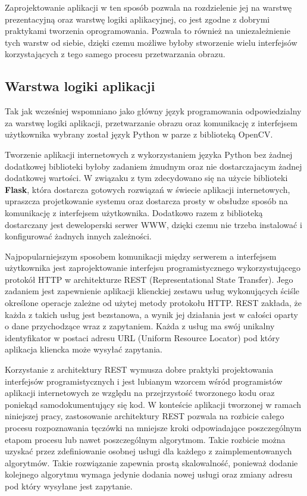 Zaprojektowanie aplikacji w ten sposób pozwala na rozdzielenie jej na warstwę prezentacyjną
oraz warstwę logiki aplikacyjnej, co jest zgodne z dobrymi praktykami tworzenia oprogramowania.
Pozwala to również na uniezależnienie tych warstw od siebie, dzięki czemu możliwe
byłoby stworzenie wielu interfejsów korzystających z tego samego procesu przetwarzania obrazu.

\subsection{Warstwa logiki aplikacji}

Tak jak wcześniej wspomniano jako główny język programowania odpowiedzialny za warstwę logiki
aplikacji, przetwarzanie obrazu oraz komunikację z interfejsem użytkownika wybrany został język
Python w parze z biblioteką OpenCV.

Tworzenie aplikacji internetowych z wykorzystaniem języka Python bez żadnej dodatkowej
biblioteki byłoby zadaniem żmudnym oraz nie dostarczajacym żadnej dodatkowej wartości. W związaku
z tym zdecydowano się na użycie biblioteki \textbf{Flask}, która dostarcza gotowych rozwiązań
w świecie aplikacji internetowych, upraszcza projetkowanie systemu oraz dostarcza prosty w obsłudze
sposób na komunikację z interfejsem użytkownika. Dodatkowo razem z biblioteką dostarczany jest
deweloperski serwer WWW, dzięki czemu nie trzeba instalowa\'c i konfigurowa\'c żadnych innych zależności.
\newline

Najpopularniejszym sposobem komunikacji między serwerem a interfejsem użytkownika jest zaprojektowanie
interfejsu programistycznego wykorzystującego protokół HTTP w architekturze REST (Representational State Transfer).
Jego zadaniem jest zapewnienie aplikacji klienckiej zestawu usług wykonujących ściśle określone
operacje zależne od użytej metody protokołu HTTP. REST zakłada, że każda z takich usług jest bezstanowa, a wynik jej działania jest w całości
oparty o dane przychodzące wraz z zapytaniem. Każda z usług ma swój unikalny identyfikator w postaci
adresu URL (Uniform Resource Locator) pod który aplikacja kliencka może wysyła\'c zapytania.

Korzystanie z architektury REST wymusza dobre praktyki projektowania interfejsów programistycznych
i jest lubianym wzorcem wśród programistów aplikacji internetowych ze względu na przejrzystoś\'c
tworzonego kodu oraz poniekąd samodokumentujący się kod.
W konteście aplikacji tworzonej w ramach niniejszej pracy, zastosowanie architektury REST pozwala
na rozbicie całego procesu rozpoznawania tęczówki na mniejsze kroki odpowiadające poszczególnym
etapom procesu lub nawet poszczególnym algorytmom. Takie rozbicie można uzyska\'c przez zdefiniowanie
osobnej usługi dla każdego z zaimplementowanych algorytmów. Takie rozwiązanie zapewnia prostą skalowalnoś\'c,
ponieważ dodanie kolejnego algorytmu wymaga jedynie dodania nowej usługi oraz zmiany adresu pod który
wysyłane jest zapytanie.


